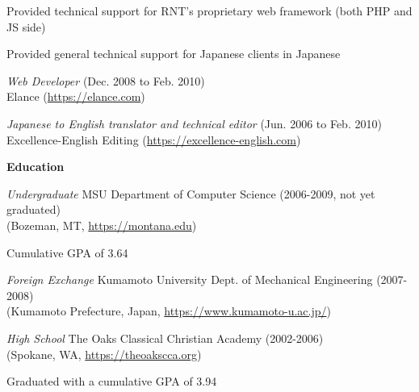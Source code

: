 \documentclass[10pt, a4paper]{article}
\begin{document}
\begin{itemize*}
    \begin{itemize*}
      \item Provided technical support for RNT's proprietary web framework (both PHP and JS side)
      \item Provided general technical support for Japanese clients in Japanese
    \end{itemize*}
  \item \emph{Web Developer} (Dec. 2008 to Feb. 2010)\\
    Elance (\url{https://elance.com})
  \item \emph{Japanese to English translator and technical editor} (Jun. 2006 to Feb. 2010)\\
    Excellence-English Editing (\url{https://excellence-english.com})
\end{itemize*}
\textbf{Education}
\begin{itemize*}
  \item \emph{Undergraduate} MSU Department of Computer Science (2006-2009, not yet graduated)\\
    (Bozeman, MT, \url{https://montana.edu})
    \begin{itemize*}
      \item Cumulative GPA of 3.64
    \end{itemize*}
  \item \emph{Foreign Exchange} Kumamoto University Dept. of Mechanical Engineering (2007-2008)\\
    (Kumamoto Prefecture, Japan, \url{https://www.kumamoto-u.ac.jp/})
  \item \emph{High School} The Oaks Classical Christian Academy (2002-2006)\\
    (Spokane, WA, \url{https://theoakscca.org})
    \begin{itemize*}
      \item Graduated with a cumulative GPA of 3.94
    \end{itemize*}
\end{itemize*}
\end{document}

